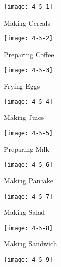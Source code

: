 \documentclass[10pt,twocolumn,letterpaper]{article}
\begin{document}
\begin{figure*}
\begin{subfigure}[t]{0.195\textwidth}
\texttt{[image: 4-5-1]}
\caption{Making Cereals}
\vspace*{2mm}
\label{fig:4-5-1}
\end{subfigure}
\hfill
\begin{subfigure}[t]{0.195\textwidth}
\texttt{[image: 4-5-2]}
\caption{Preparing Coffee}
\vspace*{0mm}
\label{fig:4-5-2}
\end{subfigure}
\hfill
\begin{subfigure}[t]{0.195\textwidth}
\texttt{[image: 4-5-3]}
\caption{Frying Eggs}
\vspace*{0mm}
\label{fig:4-5-3}
\end{subfigure}
\hfill
\begin{subfigure}[t]{0.195\textwidth}
\texttt{[image: 4-5-4]}
\caption{Making Juice}
\vspace*{0mm}
\label{fig:4-5-4}
\end{subfigure}
\hfill
\begin{subfigure}[t]{0.195\textwidth}
\texttt{[image: 4-5-5]}
\caption{Preparing Milk}
\vspace*{0mm}
\label{fig:4-5-5}
\end{subfigure}
\vfill
\begin{subfigure}[t]{0.195\textwidth}
\texttt{[image: 4-5-6]}
\caption{Making Pancake}
\vspace*{0mm}
\label{fig:4-5-6}
\end{subfigure}
\hfill
\begin{subfigure}[t]{0.195\textwidth}
\texttt{[image: 4-5-7]}
\caption{Making Salad}
\vspace*{0mm}
\label{fig:4-5-7}
\end{subfigure}
\hfill
\begin{subfigure}[t]{0.195\textwidth}
\texttt{[image: 4-5-8]}
\caption{Making Sandwich}
\vspace*{0mm}
\label{fig:4-5-8}
\end{subfigure}
\hfill
\begin{subfigure}[t]{0.195\textwidth}
\texttt{[image: 4-5-9]}

\end{subfigure}
\end{figure*}
\end{document}
